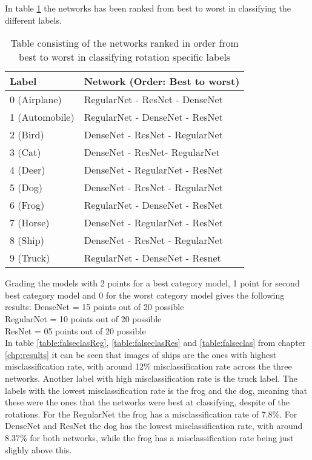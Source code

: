 In table \ref{table:results} the networks has been ranked from best to worst in classifying the different labels. 

\begin{table}[]
	\centering
	\caption{Table consisting of the networks ranked in order from best to worst in classifying rotation specific labels}
	\label{table:results}
	\begin{tabular}{|l|l|}
		\hline
		Label          & Network (Order: Best to worst) \\ \hline
		0 (Airplane)   & RegularNet - ResNet - DenseNet \\ \hline
		1 (Automobile) & RegularNet - DenseNet - ResNet \\ \hline
		2 (Bird)       & DenseNet - ResNet - RegularNet \\ \hline
		3 (Cat)        & DenseNet - ResNet- RegularNet  \\ \hline
		4 (Deer)       & DenseNet - RegularNet - ResNet \\ \hline
		5 (Dog)        & DenseNet - ResNet - RegularNet \\ \hline
		6 (Frog)       & RegularNet - DenseNet - ResNet \\ \hline
		7 (Horse)      & DenseNet - RegularNet - ResNet \\ \hline
		8 (Ship)       & DenseNet - ResNet - RegularNet \\ \hline
		9 (Truck)      & RegularNet - DenseNet - Resnet \\ \hline
	\end{tabular}
\end{table}
\FloatBarrier

Grading the models with 2 points for a best category model, 1 point for second best category model and 0 for the worst category model gives the following results:
DenseNet   = 15 points out of 20 possible\\
RegularNet = 10 points out of 20 possible\\
ResNet     = 05 points out of 20 possible\\

In table \ref{table:falseclasReg}, \ref{table:falseclasRes} and \ref{table:falseclas} from chapter \ref{chp:results} it can be seen that images of ships are the ones with highest misclassification rate, with around 12\% misclassification rate across the three networks.  Another label with high misclassification rate is the truck label. The labels with the lowest misclassification rate is the frog and the dog, meaning that these were the ones that the networks were best at classifying, despite of the rotations. For the RegularNet the frog has a misclassification rate of 7.8\%. For DenseNet and ResNet the dog has the lowest misclassification rate, with around 8.37\% for both networks, while the frog has a misclassification rate being just slighly above this.

